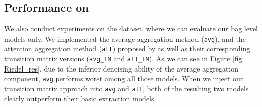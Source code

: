 \subsection{Performance on \EntityRE}
We also conduct experiments on the \EntityRE dataset, where we can evaluate our bag level models only.
We  implemented the average aggregation method (\texttt{avg}), and the attention aggregation method (\texttt{att}) proposed by \cite{lin2016neural} as well as their corresponding transition matrix versions (\texttt{avg\_TM} and \texttt{att\_TM}). As we can see in Figure \ref{fig: Riedel_res},  due to the inferior denoising ability of the average aggregation component, \texttt{avg} performs worst among all those models. %
When we inject our transition matrix approach into \texttt{avg} and \texttt{att}, both of the resulting two models clearly outperform their basic extraction models.
%
